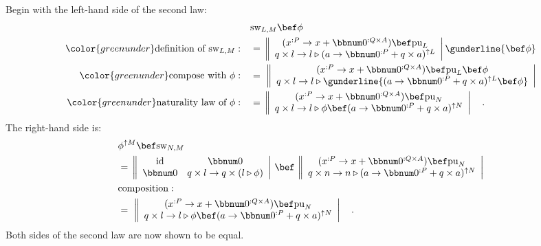 Begin with the left-hand side of the second law:
\begin{align*}
 & \text{sw}_{L,M}\bef\phi\\
{\color{greenunder}\text{definition of }\text{sw}_{L,M}:}\quad & =\,\left\Vert \begin{array}{c}
(x^{:P}\rightarrow x+\bbnum 0^{:Q\times A})\bef\text{pu}_{L}\\
q\times l\rightarrow l\triangleright(a\rightarrow\bbnum 0^{:P}+q\times a)^{\uparrow L}
\end{array}\right|\gunderline{\bef\phi}\\
{\color{greenunder}\text{compose with }\phi:}\quad & =\,\,\left\Vert \begin{array}{c}
(x^{:P}\rightarrow x+\bbnum 0^{:Q\times A})\bef\text{pu}_{L}\bef\phi\\
q\times l\rightarrow l\triangleright\gunderline{(a\rightarrow\bbnum 0^{:P}+q\times a)^{\uparrow L}\bef\phi}
\end{array}\right|\\
{\color{greenunder}\text{naturality law of }\phi:}\quad & =\,\left\Vert \begin{array}{c}
(x^{:P}\rightarrow x+\bbnum 0^{:Q\times A})\bef\text{pu}_{N}\\
q\times l\rightarrow l\triangleright\phi\bef(a\rightarrow\bbnum 0^{:P}+q\times a)^{\uparrow N}
\end{array}\right|\quad.
\end{align*}
The right-hand side is:
\begin{align*}
 & \phi^{\uparrow M}\bef\text{sw}_{N,M}\\
 & =\,\left\Vert \begin{array}{cc}
\text{id} & \bbnum 0\\
\bbnum 0 & q\times l\rightarrow q\times\left(l\triangleright\phi\right)
\end{array}\right|\,\bef\,\left\Vert \begin{array}{c}
(x^{:P}\rightarrow x+\bbnum 0^{:Q\times A})\bef\text{pu}_{N}\\
q\times n\rightarrow n\triangleright(a\rightarrow\bbnum 0^{:P}+q\times a)^{\uparrow N}
\end{array}\right|\\
 & \text{composition}:\quad\\
 & =\,\,\left\Vert \begin{array}{c}
(x^{:P}\rightarrow x+\bbnum 0^{:Q\times A})\bef\text{pu}_{N}\\
q\times l\rightarrow l\triangleright\phi\bef(a\rightarrow\bbnum 0^{:P}+q\times a)^{\uparrow N}
\end{array}\right|\quad.
\end{align*}
Both sides of the second law are now shown to be equal.

